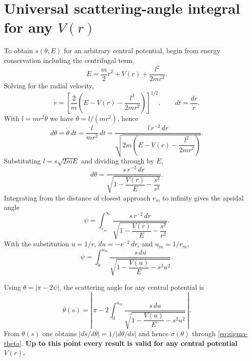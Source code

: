 \documentclass[11pt]{article}
\begin{document}
\section{Universal scattering-angle integral for any $V(r)$}

To obtain $s(\theta,E)$ for an arbitrary central potential, begin from energy conservation
including the centrifugal term,
\begin{equation}
  E = \frac{m}{2}\dot{r}^2 + V(r) + \frac{l^2}{2mr^2}.
\end{equation}
Solving for the radial velocity,
\begin{equation}
  \dot{r} = \left[\frac{2}{m}\left(E - V(r) - \frac{l^2}{2mr^2}\right)\right]^{1/2},
  \qquad dt = \frac{dr}{\dot{r}}.
\end{equation}
With $l = mr^2\dot{\theta}$ we have $\dot{\theta} = l/(mr^2)$, hence
\begin{equation}
  d\theta = \dot{\theta}\,dt = \frac{l}{mr^2}\,dt
  = \frac{l\,r^{-2}\,dr}
         {\sqrt{2m\left(E - V(r) - \dfrac{l^2}{2mr^2}\right)}}.
\end{equation}
Substituting $l = s\sqrt{2mE}$ and dividing through by $E$,
\begin{equation}
  d\theta = \frac{s\,r^{-2}\,dr}{\sqrt{1 - \dfrac{V(r)}{E} - \dfrac{s^2}{r^2}}}.
\end{equation}
Integrating from the distance of closest approach $r_m$ to infinity gives the apsidal
angle
\begin{equation}
  \psi = \int_{r_m}^{\infty}
  \frac{s\,r^{-2}\,dr}{\sqrt{1 - \dfrac{V(r)}{E} - \dfrac{s^2}{r^2}}}.
\end{equation}
With the substitution $u = 1/r$, $du = -r^{-2}\,dr$, and $u_m = 1/r_m$,
\begin{equation}
  \psi = \int_0^{u_m}
  \frac{s\,du}{\sqrt{1 - \dfrac{V(u)}{E} - s^2 u^2}}.
\end{equation}

Using $\theta = |\pi - 2\psi|$, the scattering angle for any central potential is
\begin{equation}
  \theta(s) = \left\lvert\,
  \pi - 2\int_0^{u_m}
  \frac{s\,du}{\sqrt{1 - \dfrac{V(u)}{E} - s^2 u^2}}
  \,\right\rvert.
  \label{eq:theta-universal}
\end{equation}
From $\theta(s)$ one obtains $\lvert ds/d\theta\rvert = 1/\lvert d\theta/ds\rvert$ and hence
$\sigma(\theta)$ through \eqref{eq:sigma-theta}.
\textbf{Up to this point every result is valid for any central potential $V(r)$.}
\end{document}
